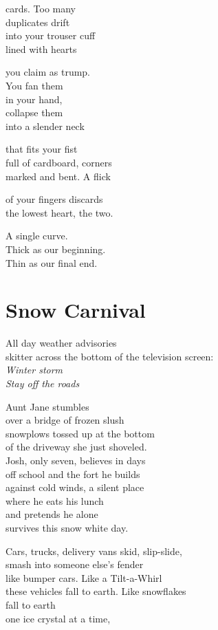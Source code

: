 \documentclass[twoside,10pt]{book}
\begin{document}
cards. Too many\\
duplicates drift\\
into your trouser cuff\\
lined with hearts

you claim as trump.\\
You fan them\\
in your hand,\\
collapse them\\
into a slender neck

that fits your fist\\
full of cardboard, corners\\
marked and bent. A flick

of your fingers discards\\
the lowest heart, the two.

A single curve.\\
Thick as our beginning.\\
Thin as our final end.


\clearpage
\section{Snow Carnival}

All day weather advisories\\
skitter across the bottom of the television screen:\\
\emph{Winter storm\\
Stay off the roads}

Aunt Jane stumbles\\
over a bridge of frozen slush\\
snowplows tossed up at the bottom\\
of the driveway she just shoveled.\\
Josh, only seven, believes in days\\
off school and the fort he builds\\
against cold winds, a silent place\\
where he eats his lunch\\
and pretends he alone\\
survives this snow white day.

Cars, trucks, delivery vans skid, slip-slide,\\
smash into someone else's fender\\
like bumper cars. Like a Tilt-a-Whirl\\
these vehicles fall to earth. Like snowflakes\\
fall to earth\\
one ice crystal at a time,
\end{document}
